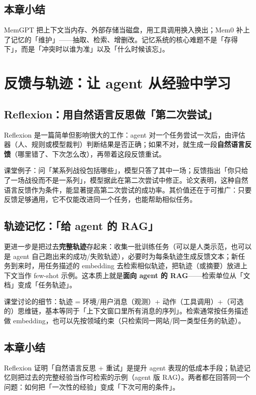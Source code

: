 ﻿\documentclass[a4paper]{article}
\begin{document}
\subsection{本章小结}
MemGPT 把上下文当内存、外部存储当磁盘，用工具调用换入换出；Mem0 补上了记忆的「维护」——抽取、检索、增删改。记忆系统的核心难题不是「存得下」，而是「冲突时以谁为准」以及「什么时候该忘」。

\section{反馈与轨迹：让 agent 从经验中学习}

\subsection{Reflexion：用自然语言反思做「第二次尝试」}

Reflexion 是一篇简单但影响很大的工作：agent 对一个任务尝试一次后，由评估器（人、规则或模型裁判）判断结果是否正确；如果不对，就生成一段\textbf{自然语言反馈}（哪里错了、下次怎么改），再带着这段反馈重试。

课堂例子：问「某系列战役包括哪些」，模型只答了其中一场；反馈指出「你只给了一场战役而不是一系列」，模型据此在第二次尝试中修正。论文表明，这种自然语言反馈作为条件，能显著提高第二次尝试的成功率。其价值还在于可推广：只要反馈足够通用，它不仅能改进同一个任务，也能帮助相似任务。

\subsection{轨迹记忆：「给 agent 的 RAG」}

更进一步是把过去\textbf{完整轨迹}存起来：收集一批训练任务（可以是人类示范，也可以是 agent 自己跑出来的成功/失败轨迹），必要时为每条轨迹生成反馈文本；新任务到来时，用任务描述的 embedding 去检索相似轨迹，把轨迹（或摘要）放进上下文当作 few-shot 示例。这本质上就是\textbf{面向 agent 的 RAG}——检索单位从「文档」变成「任务轨迹」。

课堂讨论的细节：轨迹 = 环境/用户消息（观测）+ 动作（工具调用）+（可选的）思维链，基本等同于「上下文窗口里所有消息的序列」。检索通常按任务描述做 embedding，也可以先按领域约束（只检索同一网站/同一类型任务的轨迹）。

\subsection{本章小结}
Reflexion 证明「自然语言反思 + 重试」是提升 agent 表现的低成本手段；轨迹记忆则把过去的完整经验当作可检索的示例（agent 版 RAG）。两者都在回答同一个问题：如何把「一次性的经验」变成「下次可用的条件」。
\end{document}
